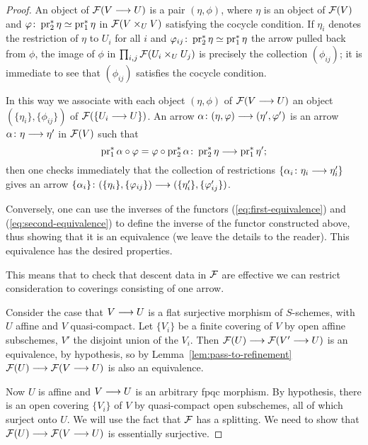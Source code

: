\begin{4   STACKS}
\begin{4.2 Descent for quasi-coherent sheaves}
\begin{proof}
An object of $\mathcal{F}(V \longrightarrow U)$ is a pair $(\eta, \phi)$, where $\eta$ is an object of $\mathcal{F}(V)$ and $\varphi \colon \operatorname{pr}_2^* \eta \simeq \operatorname{pr}_1^* \eta$ in $\mathcal{F}(V \times_U V)$ satisfying the cocycle condition. If $\eta_i$ denotes the restriction of $\eta$ to $U_i$ for all $i$ and $\varphi_{ij} \colon \operatorname{pr}_2^* \eta \simeq \operatorname{pr}_1^* \eta$ the arrow pulled back from $\phi$, the image of $\phi$ in $\prod_{i,j}\mathcal{F}(U_i \times_U U_j)$ is precisely the collection $(\phi_{ij})$; it is immediate to see that $(\phi_{ij})$ satisfies the cocycle condition. 

In this way we associate with each object  $(\eta, \phi)$ of $\mathcal{F}(V \longrightarrow U)$ an object $(\{\eta_i\}, \{\phi_{ij}\})$ of $\mathcal{F}(\{U_i \longrightarrow U\})$. An arrow $\alpha \colon (\eta, \phi) \arr (\eta', \phi')$ is an arrow $\alpha \colon \eta \arr \eta'$ in $\mathcal{F}(V)$ such that
   \[
   \pr_1^* \alpha \circ \phi = \phi \circ \pr_2^* \alpha \colon 
   \pr_2^* \eta \arr \pr_1^* \eta';
   \]
then one checks immediately that the collection of restrictions $\{\alpha_i \colon \eta_i \arr \eta'_i\}$ gives an arrow $\{\alpha_i\} \colon (\{\eta_i\}, \{\phi_{ij}\}) \arr (\{\eta'_i\}, \{\phi'_{ij}\})$.

Conversely, one can use the inverses of the functors (\ref{eq:first-equivalence}) and (\ref{eq:second-equivalence}) to define the inverse of the functor constructed above, thus showing that it is an equivalence (we leave the details to the reader). This equivalence has the desired properties.

This means that to check that descent data in $\mathcal{F}$ are effective we can restrict consideration to coverings consisting of one arrow.


Consider the case that $V \arr U$ is a flat surjective morphism of $S$-schemes, with $U$ affine and $V$ quasi-compact. Let $\{V_{i}\}$ be a finite covering of $V$ by open affine subschemes, $V'$ the disjoint union of the $V_{i}$. Then $\cF(U) \arr \cF(V' \to U)$ is an equivalence, by hypothesis, so by Lemma~\ref{lem:pass-to-refinement} $\cF(U) \arr \cF(V \to U)$ is also an equivalence.


Now $U$ is affine and $V \arr U$ is an arbitrary fpqc morphism. By hypothesis, there is an open covering $\{V_{i}\}$ of $V$ by quasi-compact open subschemes, all of which surject onto $U$. We will use the fact that $\mathcal{F}$ has a splitting. We need to show that $\cF(U) \arr \cF(V \to U)$ is essentially surjective.


\end{proof}
\end{4.2 Descent for quasi-coherent sheaves}
\end{4   STACKS}
